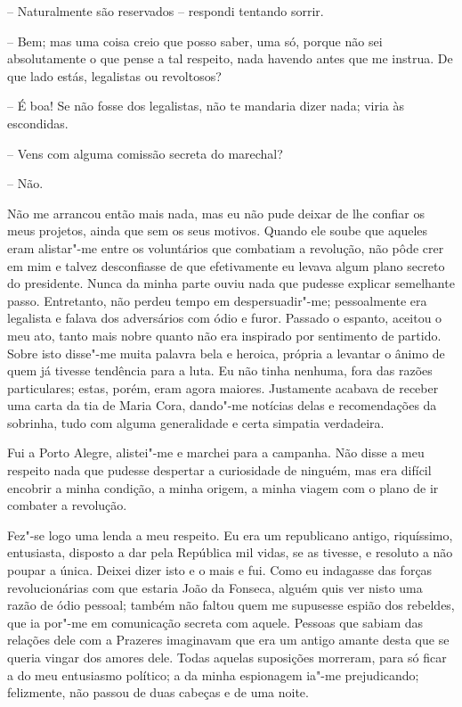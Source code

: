 -- Naturalmente são reservados -- respondi tentando sorrir.

-- Bem; mas uma coisa creio que posso saber, uma só, porque não sei
absolutamente o que pense a tal respeito, nada havendo antes que me
instrua. De que lado estás, legalistas ou revoltosos?

-- É boa! Se não fosse dos legalistas, não te mandaria dizer nada; viria
às escondidas.

-- Vens com alguma comissão secreta do marechal?

-- Não.

Não me arrancou então mais nada, mas eu não pude deixar de lhe confiar
os meus projetos, ainda que sem os seus motivos. Quando ele soube que
aqueles eram alistar"-me entre os voluntários que combatiam a revolução,
não pôde crer em mim e talvez desconfiasse de que efetivamente eu levava
algum plano secreto do presidente. Nunca da minha parte ouviu nada que
pudesse explicar semelhante passo. Entretanto, não perdeu tempo em
despersuadir"-me; pessoalmente era legalista e falava dos adversários com
ódio e furor. Passado o espanto, aceitou o meu ato, tanto mais nobre
quanto não era inspirado por sentimento de partido. Sobre isto disse"-me
muita palavra bela e heroica, própria a levantar o ânimo de quem já
tivesse tendência para a luta. Eu não tinha nenhuma, fora das razões
particulares; estas, porém, eram agora maiores. Justamente acabava de
receber uma carta da tia de Maria Cora, dando"-me notícias delas e
recomendações da sobrinha, tudo com alguma generalidade e certa simpatia
verdadeira.

Fui a Porto Alegre, alistei"-me e marchei para a campanha. Não disse a
meu respeito nada que pudesse despertar a curiosidade de ninguém, mas
era difícil encobrir a minha condição, a minha origem, a minha viagem
com o plano de ir combater a revolução.

Fez"-se logo uma lenda a meu respeito. Eu era um republicano antigo,
riquíssimo, entusiasta, disposto a dar pela República mil vidas, se as
tivesse, e resoluto a não poupar a única. Deixei dizer isto e o mais e
fui. Como eu indagasse das forças revolucionárias com que estaria João
da Fonseca, alguém quis ver nisto uma razão de ódio pessoal; também não
faltou quem me supusesse espião dos rebeldes, que ia por"-me em
comunicação secreta com aquele. Pessoas que sabiam das relações dele com
a Prazeres imaginavam que era um antigo amante desta que se queria
vingar dos amores dele. Todas aquelas suposições morreram, para só ficar
a do meu entusiasmo político; a da minha espionagem ia"-me prejudicando;
felizmente, não passou de duas cabeças e de uma noite.

